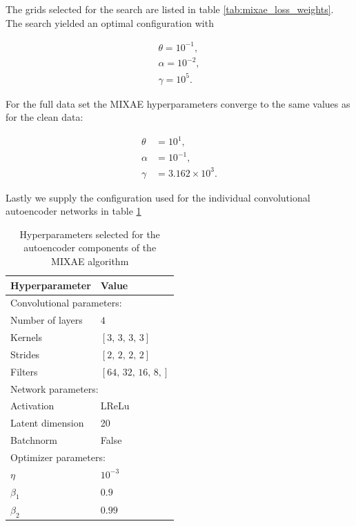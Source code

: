 \documentclass[review,sort&compress]{elsarticle}
\begin{document}
The grids selected for the search are listed in table \ref{tab:mixae_loss_weights}. The search yielded an optimal configuration with 

\begin{align}
\theta = 10^{-1}, \\
\alpha = 10^{-2}, \\
\gamma = 10^5.
\end{align}

For the full data set the MIXAE hyperparameters converge to the same values as for the clean data:

\begin{align}
\theta &= 10^{1}, \\
\alpha &= 10^{-1}, \\
\gamma &= 3.162\times 10^3.
\end{align}

Lastly we supply the configuration used for the individual convolutional autoencoder networks in table \ref{tab:mixe_ae_hyperparams}

\begin{table}[H]
\renewcommand*{\arraystretch}{0.5}
\centering
\caption{Hyperparameters selected for the autoencoder components of the MIXAE algorithm}\label{tab:mixe_ae_hyperparams}
\setlength{\extrarowheight}{15pt}
\hspace*{-0.5in}
\begin{tabular}{ll}
\toprule
Hyperparameter & Value \\
\midrule
\multicolumn{2}{l}{Convolutional parameters: } \\
\midrule
Number of layers & $4$ \\
Kernels & $[3,\,3,\,3,\,3]$\\
Strides & $[2,\,2,\,2,\,2]$ \\
Filters & $[64,\, 32, \,16, \,8,]$ \\ 
\midrule
\multicolumn{2}{l}{Network parameters: } \\
\midrule
Activation & LReLu \\
Latent dimension & 20  \\
Batchnorm & False \\
\midrule
\multicolumn{2}{l}{Optimizer parameters: } \\
\midrule
$\eta$ & $10^{-3}$ \\
$\beta_1$ & $0.9$ \\
$\beta_2$ & $0.99$ \\
\bottomrule
\end{tabular}
\end{table}
\end{document}
